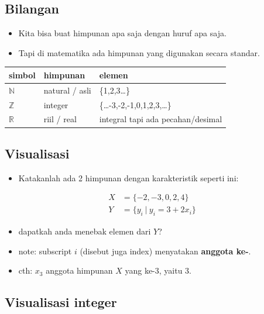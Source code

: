 \documentclass[
  letterpaper,
  DIV=11,
  numbers=noendperiod]{scrartcl}
\providecommand{\tightlist}{%
  \setlength{\itemsep}{0pt}\setlength{\parskip}{0pt}}\usepackage{longtable,booktabs,array}
\begin{document}
\subsection{Bilangan}\label{bilangan}

\begin{itemize}
\item
  Kita bisa buat himpunan apa saja dengan huruf apa saja.
\item
  Tapi di matematika ada himpunan yang digunakan secara standar.
\end{itemize}

\begin{longtable}[]{@{}lll@{}}
\toprule\noalign{}
simbol & himpunan & elemen \\
\midrule\noalign{}
\endhead
\bottomrule\noalign{}
\endlastfoot
\(\mathbb{N}\) & natural / asli & \{1,2,3\ldots\} \\
\(\mathbb{Z}\) & integer & \{\ldots-3,-2,-1,0,1,2,3,\ldots\} \\
\(\mathbb{R}\) & riil / real & integral tapi ada pecahan/desimal \\
\end{longtable}

\subsection{Visualisasi}\label{visualisasi-2}

\begin{itemize}
\tightlist
\item
  Katakanlah ada 2 himpunan dengan karakteristik seperti ini:
\end{itemize}

\[
\begin{align}
X&=\{-2,-3,0,2,4\} \\
Y&=\{y_i \ |\  y_i=3+2x_i\}
\end{align}
\]

\begin{itemize}
\item
  dapatkah anda menebak elemen dari \(Y\)?
\item
  note: subscript \(i\) (disebut juga index) menyatakan \textbf{anggota
  ke-}.
\item
  cth: \(x_3\) anggota himpunan \(X\) yang ke-3, yaitu 3.
\end{itemize}

\subsection{Visualisasi integer}\label{visualisasi-integer}
\end{document}
